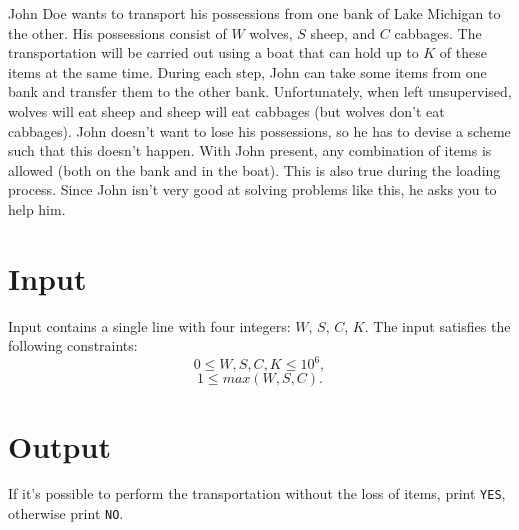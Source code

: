 

John Doe wants to transport his possessions from one bank of Lake Michigan to the other. His possessions consist of $W$ wolves, $S$ sheep, and
$C$ cabbages. The transportation will be carried out using a boat that can hold up to $K$ of these items at the same time.
During each step, John can take some items from one bank and transfer them to the other bank. Unfortunately,
when left unsupervised, wolves will eat sheep and sheep will eat cabbages (but wolves don't eat cabbages). John doesn't want to lose his possessions, so he has to devise a
scheme such that this doesn't happen. With John present, any combination of items is allowed (both on the bank and in the boat). This is
also true during the loading process. Since John isn't very good at solving problems like this, he asks you to help him.

\section*{Input}
Input contains a single line with four integers: $W$, $S$, $C$, $K$. The input satisfies the following constraints:
$$0 \leq W, S, C, K \leq 10^6,$$
$$1 \leq max(W, S, C).$$
\section*{Output}
If it's possible to perform the transportation without the loss of items, print \texttt{YES}, otherwise print \texttt{NO}.
